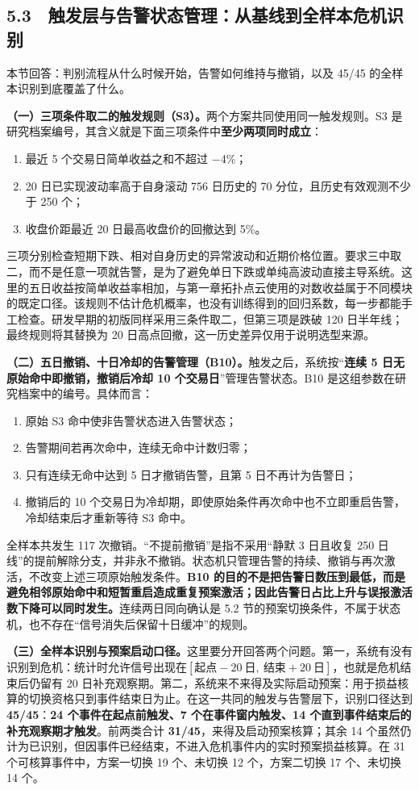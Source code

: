 \documentclass[12pt,a4paper]{ctexart}
\begin{document}
\subsection{5.3　触发层与告警状态管理：从基线到全样本危机识别}
本节回答：判别流程从什么时候开始，告警如何维持与撤销，以及 45/45 的全样本识别到底覆盖了什么。\par
\textbf{（一）三项条件取二的触发规则（S3）。}两个方案共同使用同一触发规则。S3 是研究档案编号，其含义就是下面三项条件中\textbf{至少两项同时成立}：
\begin{enumerate}
\item 最近 5 个交易日简单收益之和不超过 \(-\)4\%；
\item 20 日已实现波动率高于自身滚动 756 日历史的 70 分位，且历史有效观测不少于 250 个；
\item 收盘价距最近 20 日最高收盘价的回撤达到 5\%。
\end{enumerate}
三项分别检查短期下跌、相对自身历史的异常波动和近期价格位置。要求三中取二，而不是任意一项就告警，是为了避免单日下跌或单纯高波动直接主导系统。这里的五日收益按简单收益率相加，与第一章拓扑点云使用的对数收益属于不同模块的既定口径。该规则不估计危机概率，也没有训练得到的回归系数，每一步都能手工检查。研发早期的初版同样采用三条件取二，但第三项是跌破 120 日半年线；最终规则将其替换为 20 日高点回撤，这一历史差异仅用于说明选型来源。\par
\textbf{（二）五日撤销、十日冷却的告警管理（B10）。}触发之后，系统按“\textbf{连续 5 日无原始命中即撤销，撤销后冷却 10 个交易日}”管理告警状态。B10 是这组参数在研究档案中的编号。具体而言：
\begin{enumerate}
\item 原始 S3 命中使非告警状态进入告警状态；
\item 告警期间若再次命中，连续无命中计数归零；
\item 只有连续无命中达到 5 日才撤销告警，且第 5 日不再计为告警日；
\item 撤销后的 10 个交易日为冷却期，即使原始条件再次命中也不立即重启告警，冷却结束后才重新等待 S3 命中。
\end{enumerate}
全样本共发生 117 次撤销。“不提前撤销”是指不采用“静默 3 日且收复 250 日线”的提前解除分支，并非永不撤销。状态机只管理告警的持续、撤销与再次激活，不改变上述三项原始触发条件。\textbf{B10 的目的不是把告警日数压到最低，而是避免相邻原始命中和短暂重启造成重复预案激活；因此告警日占比上升与误报激活数下降可以同时发生。}连续两日同向确认是 5.2 节的预案切换条件，不属于状态机，也不存在“信号消失后保留十日缓冲”的规则。\par
\textbf{（三）全样本识别与预案启动口径。}这里要分开回答两个问题。第一，系统有没有识别到危机：统计时允许信号出现在\([\text{起点}-20\ \text{日},\ \text{结束}+20\ \text{日}]\)，也就是危机结束后仍留有 20 日补充观察期。第二，系统来不来得及实际启动预案：用于损益核算的切换资格只到事件结束日为止。在这一共同的触发与告警层下，识别口径达到 \textbf{45/45}：\textbf{24 个事件在起点前触发、7 个在事件窗内触发、14 个直到事件结束后的补充观察期才触发}。前两类合计 \textbf{31/45}，来得及启动预案核算；其余 14 个虽然仍计为已识别，但因事件已经结束，不进入危机事件内的实时预案损益核算。在 31 个可核算事件中，方案一切换 19 个、未切换 12 个，方案二切换 17 个、未切换 14 个。\par
\end{document}
